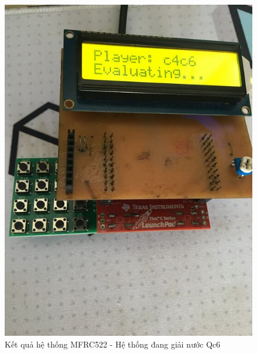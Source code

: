 \begin{figure}[ht]
\centering
\includegraphics[scale=0.3]{images/chess_c4c6.jpg}
\caption{Kết quả hệ thống MFRC522 - Hệ thống đang giải nước Qc6}
\label{fig:chess_c4c6}
\end{figure}

